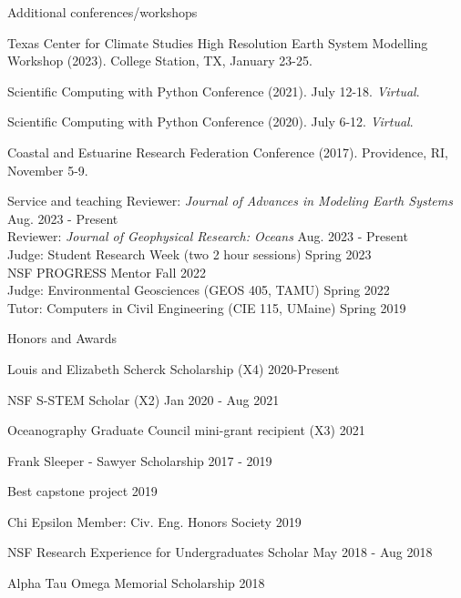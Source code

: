 \documentclass{resume} %
\begin{document}
\begin{rSection}{Additional conferences/workshops} \itemsep -3pt
\begin{etaremune}
    \item Texas Center for Climate Studies High Resolution Earth System Modelling Workshop (2023). College Station, TX, January 23-25. 
    \item Scientific Computing with Python Conference (2021). July 12-18. \textit{Virtual}. 
    \item Scientific Computing with Python Conference (2020). July 6-12.  \textit{Virtual}.
    \item Coastal and Estuarine Research Federation Conference (2017). Providence, RI, November 5-9.
\end{etaremune}
\end{rSection}

\begin{rSection}{Service and teaching}
Reviewer: \textit{Journal of Advances in Modeling Earth Systems} \hfill Aug. 2023 - Present \\
Reviewer: \textit{Journal of Geophysical Research: Oceans} \hfill Aug. 2023 - Present \\
Judge: Student Research Week (two 2 hour sessions) \hfill Spring 2023 \\
NSF PROGRESS Mentor \hfill Fall 2022 \\
Judge: Environmental Geosciences (GEOS 405, TAMU) \hfill Spring 2022 \\
Tutor: Computers in Civil Engineering (CIE 115, UMaine) \hfill Spring 2019 \\
\end{rSection}
\vspace{-10pt}
\begin{rSection}{Honors and Awards} \itemsep -3pt {}
\vspace{-7pt}
\item Louis and Elizabeth Scherck Scholarship (X4) \hfill 2020-Present
\item NSF S-STEM Scholar (X2) \hfill Jan 2020 - Aug 2021 
\item Oceanography Graduate Council mini-grant recipient (X3) \hfill 2021
\item Frank Sleeper - Sawyer Scholarship \hfill 2017 - 2019
\item Best capstone project \hfill 2019
\item Chi Epsilon Member: Civ. Eng. Honors Society \hfill 2019 
\item NSF Research Experience for Undergraduates Scholar \hfill May 2018 - Aug 2018
\item Alpha Tau Omega Memorial Scholarship \hfill 2018
\end{rSection}
\end{document}
